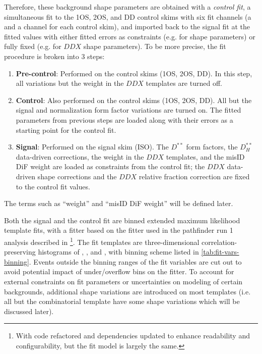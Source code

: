 Therefore, these background shape parameters are obtained with a
\emph{control fit},
a simultaneous fit to the 1OS, 2OS, and DD control skims with six fit channels
(a \Dz and a \Dstar channel for each control skim),
and imported back to the signal fit at the fitted values with either
fitted errors as constraints (e.g. for \Dstst shape parameters) or fully fixed
(e.g. for $DDX$ shape parameters).
To be more precise,
the fit procedure is broken into 3 steps:

\begin{enumerate}
    \item \textbf{Pre-control}:
        Performed on the control skims (1OS, 2OS, DD).
        In this step, all variations but the \Kstar weight in the $DDX$
        templates are turned off.
    \item \textbf{Control}:
        Also performed on the control skims (1OS, 2OS, DD).
        All but the signal and normalization form factor variations are turned
        on.
        The fitted parameters from previous steps are loaded along with their
        errors as a starting point for the control fit.
    \item \textbf{Signal}:
        Performed on the signal skim (ISO).
        The $D^{**}$ form factors,
        the $D_H^{**}$ data-driven corrections,
        the \Kstar weight in the $DDX$ templates,
        and the misID DiF weight
        are loaded as constraints from the control fit;
        the $DDX$ data-driven shape corrections and
        the $DDX$ relative fraction correction
        are fixed to the control fit values.
\end{enumerate}
The terms such as ``\Kstar weight'' and ``misID DiF weight'' will be defined
later.

Both the signal and the control fit are binned extended maximum likelihood
template fits,
with a fitter based on the \HistFactory fitter
used in the pathfinder run 1 \RDX analysis described in
\cite{LHCb-ANA-2020-056}\footnote{
    With code refactored and dependencies updated to enhance readability and
    configurability,
    but the fit model is largely the same.
}.
The fit templates are three-dimensional correlation-preserving
histograms of \mmSq, \el, and \qSq,
with binning scheme listed in \cref{tab:fit-vars-binning}.
Events outside the binning ranges of the fit variables are cut out to avoid
potential impact of under/overflow bins on the fitter.
To account for external constraints on fit parameters or uncertainties on
modeling of certain backgrounds,
additional shape variations are introduced on most templates
(i.e. all but the \Dstar combinatorial template have some shape variations which
will be discussed later).

